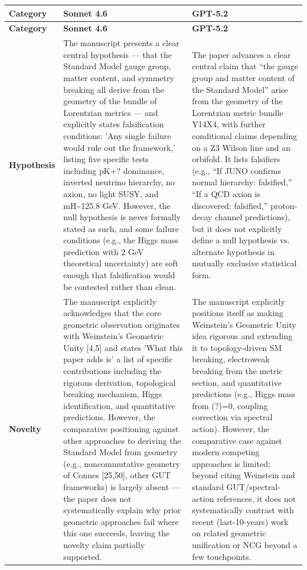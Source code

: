 \documentclass[11pt]{article}
\begin{document}
\begin{longtable}{@{} p{2.2cm} p{6.3cm} p{6.3cm} @{}}
\toprule
\textbf{Category} & \textbf{Sonnet 4.6} & \textbf{GPT-5.2} \\
\midrule
\endfirsthead
\toprule
\textbf{Category} & \textbf{Sonnet 4.6} & \textbf{GPT-5.2} \\
\midrule
\endhead
\bottomrule
\endlastfoot

\rowcolor{rowgray}
\textbf{Hypothesis} &
The manuscript presents a clear central hypothesis --- that the Standard Model gauge group, matter content, and symmetry breaking all derive from the geometry of the bundle of Lorentzian metrics --- and explicitly states falsification conditions: 'Any single failure would rule out the framework,' listing five specific tests including p\textrightarrow{}K+\textnu{}? dominance, inverted neutrino hierarchy, no axion, no light SUSY, and mH\textasciitilde{}125.8 GeV. However, the null hypothesis is never formally stated as such, and some failure conditions (e.g., the Higgs mass prediction with \textpm{}2 GeV theoretical uncertainty) are soft enough that falsification would be contested rather than clean. &
The paper advances a clear central claim that ``the gauge group and matter content of the Standard Model'' arise from the geometry of the Lorentzian metric bundle Y14\textrightarrow{}X4, with further conditional claims depending on a Z3 Wilson line and an orbifold. It lists falsifiers (e.g., ``If JUNO confirms normal hierarchy: falsified,'' ``If a QCD axion is discovered: falsified,'' proton-decay channel predictions), but it does not explicitly define a null hypothesis vs. alternate hypothesis in mutually exclusive statistical form. \\[6pt]

\textbf{Novelty} &
The manuscript explicitly acknowledges that the core geometric observation originates with Weinstein's Geometric Unity [4,5] and states 'What this paper adds is' a list of specific contributions including the rigorous derivation, topological breaking mechanism, Higgs identification, and quantitative predictions. However, the comparative positioning against other approaches to deriving the Standard Model from geometry (e.g., noncommutative geometry of Connes [25,50], other GUT frameworks) is largely absent --- the paper does not systematically explain why prior geometric approaches fail where this one succeeds, leaving the novelty claim partially supported. &
The manuscript explicitly positions itself as making Weinstein's Geometric Unity idea rigorous and extending it to topology-driven SM breaking, electroweak breaking from the metric section, and quantitative predictions (e.g., Higgs mass from \textlambda{}(?)=0, coupling correction via spectral action). However, the comparative case against modern competing approaches is limited; beyond citing Weinstein and standard GUT/spectral-action references, it does not systematically contrast with recent (last-10-years) work on related geometric unification or NCG beyond a few touchpoints. \\[6pt]


\end{longtable}
\end{document}
